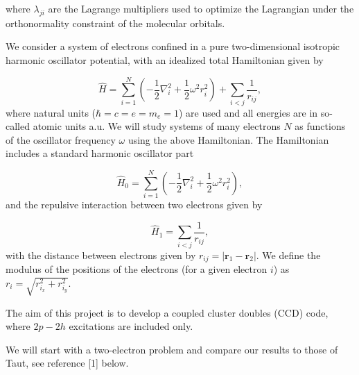 \documentclass[%
oneside,                 %
final,                   %
10pt]{article}
\begin{document}
where $\lambda_{ji}$ are the Lagrange multipliers used to optimize the
Lagrangian under the orthonormality constraint of the molecular orbitals.




We consider a system of electrons confined in a pure two-dimensional
isotropic harmonic oscillator potential, with an idealized  total Hamiltonian given by

\begin{equation}
\label{eq:finalH}
\hat{H}=\sum_{i=1}^{N} \left(  -\frac{1}{2} \nabla_i^2
+ \frac{1}{2} \omega^2r_i^2  \right)+\sum_{i<j}\frac{1}{r_{ij}},
\end{equation}
where natural units ($\hbar=c=e=m_e=1$) are used and all energies are in
so-called atomic units a.u. We will study systems of many electrons $N$ as
functions of the oscillator frequency  $\omega$ using the above Hamiltonian.
The Hamiltonian includes a standard harmonic oscillator part

\begin{equation*}
\hat{H}_0=\sum_{i=1}^{N} \left(  -\frac{1}{2} \nabla_i^2 + \frac{1}{2} \omega^2r_i^2  \right),
\end{equation*}
and the repulsive interaction between two electrons given by

\begin{equation*}
\hat{H}_1=\sum_{i<j}\frac{1}{r_{ij}},
\end{equation*}
with the distance between electrons given by $r_{ij}=\vert \bm{r}_1-\bm{r}_2\vert$. We define the
modulus of the positions of the electrons (for a given electron $i$) as $r_i = \sqrt{r_{i_x}^2+r_{i_y}^2}$.

The aim of this project is to develop a coupled cluster doubles (CCD) code, where $2p-2h$ excitations are included only.

We will start with a two-electron problem and compare our results to those of Taut, see reference [1] below.
\end{document}
